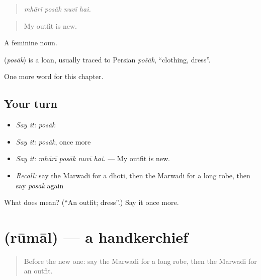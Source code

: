 \begin{quote}
   
\end{quote}

\begin{quote}
\emph{mhārī posāk nuvī hai.}
\end{quote}

\begin{quote}
My outfit is new.
\end{quote}

A feminine noun.

\begin{cousinweb}
\textbf{} (\emph{posāk}) is a loan, usually traced to Persian \emph{pošāk}, \textquotedblleft{}clothing, dress\textquotedblright{}.
\end{cousinweb}

\begin{grammarlens}[title={What you've built}]
One more word for this chapter.
\end{grammarlens}

\subsection*{Your turn}
\begin{itemize}
\raggedright
  \item \emph{Say it:} \emph{posāk}
  \item \emph{Say it:} \emph{posāk}, once more
  \item \emph{Say it:} \emph{mhārī posāk nuvī hai.} — My outfit is new.
  \item \emph{Recall:} say the Marwadi for a dhoti, then the Marwadi for a long robe, then say \emph{posāk} again
\end{itemize}

\begin{tcolorbox}[breakable,colback=teal!4,colframe=teal!35!black,title={Before you move on}]
What does  mean? (\textquotedblleft{}An outfit; dress\textquotedblright{}.) Say it once more.
\end{tcolorbox}
\section[\texorpdfstring{\mw{रूमाल} (rūmāl)}{रूमाल (rūmāl)}]{ (rūmāl) — a handkerchief}

\label{lesson:MW-C190-rumal}



\begin{quote}
Before the new one: say the Marwadi for a long robe, then the Marwadi for an outfit.
\end{quote}

